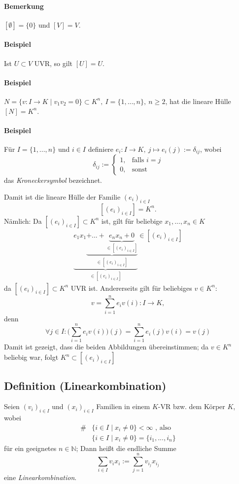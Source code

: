  	\paragraph{Bemerkung}
 		$[\emptyset ] = \{0\}$ und $[V] = V$.

 	\paragraph{Beispiel}
 		Ist $U\subset V$ UVR, so gilt $[U] = U$.

 	\paragraph{Beispiel}
 		$N=\{v:I\to K\mid v_1v_2=0\} \subset K^n,\ I=\{1,...,n\},\ n\geq 2$, hat die lineare Hülle $[N]=K^n$.

 	\paragraph{Beispiel}
 		Für $I=\{1,...,n\}$ und $i\in I$ definiere
 		$e_i:I\to K ,\ j\mapsto e_i(j):= \delta_{ij}$, wobei
 		\begin{equation*}
 			\delta_{ij} :=
 			\begin{cases}
 				1, & \text{falls }i=j \\
 				0, & \text{sonst}
 			\end{cases}
 		\end{equation*}
 		das \emph{Kroneckersymbol} bezeichnet.

 		Damit ist die lineare Hülle der Familie $(e_i)_{i\in I}$
 		\[
 			[(e_i)_{i\in I}] = K^n.
 		\]
 		Nämlich: Da $[(e_i)_{i\in I}]\subset K^n$ ist, gilt für beliebige $x_1,...,x_n\in K$
 		\begin{gather*}
 			\underbrace{e_1x_1\underbrace{+...+\underbrace{e_nx_n + 0}_{\in [(e_i)_{i\in I}]}}_{\in [(e_i)_{i\in I}]}}_{\in [(e_i)_{i\in I}]}\in [(e_i)_{i\in I}]
 		\end{gather*}
 		da $[(e_i)_{i\in I}] \subset K^n$ UVR ist.
 		Andererseits gilt für beliebiges $v\in K^n$:
 		\[
 			v=\sum^n_{i=1}e_iv(i): I\to K,
 		\]
 		denn
 		\[
 			\forall j\in I: \bigg(\sum^n_{i=1} e_iv(i)\bigg)(j) = \sum^n_{i=1}e_i(j)v(i) = v(j)
 		\]
 		Damit ist gezeigt, dass die beiden Abbildungen übereinstimmen; da $v\in K^n$ beliebig war, folgt $K^n \subset [(e_i)_{i\in I}]$

 \subsection{Definition (Linearkombination)}
 	\begin{Definition}
 		Seien $(v_i)_{i\in I}$ und $(x_i)_{i\in I}$ Familien in einem $ K $-VR bzw. dem Körper $ K $, wobei
 		\begin{align*}
 			\# & \{i\in I\mid x_i \neq 0\} < \infty\text{ , also} \\
 			   & \{i\in I \mid x_i \neq 0\} = \{i_1,...,i_n\}
 		\end{align*}
 		für ein geeignetes  $n\in \mathbb{N}$;
 		Dann heißt die endliche Summe
 		\[
 			\sum_{i\in I} v_ix_i:= \sum^n_{j=1}v_{i_j}x_{i_j}
 		\]
 		eine \emph{Linearkombination}.
 	\end{Definition}

